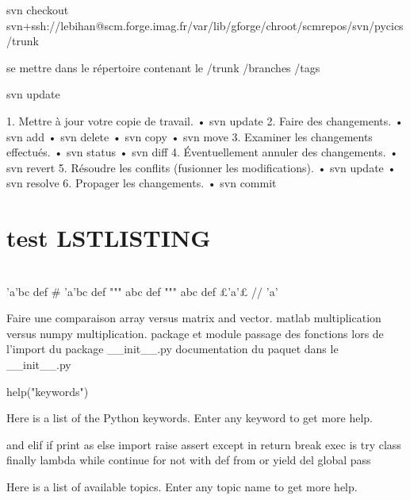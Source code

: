 svn checkout svn+ssh://lebihan@scm.forge.imag.fr/var/lib/gforge/chroot/scmrepos/svn/pycics/trunk

se mettre dans le répertoire contenant le /trunk /branches /tags 

svn update

1. Mettre à jour votre copie de travail.
• svn update
2. Faire des changements.
• svn add
• svn delete
• svn copy
• svn move
3. Examiner les changements effectués.
• svn status
• svn diff
4. Éventuellement annuler des changements.
• svn revert
5. Résoudre les conflits (fusionner les modifications).
• svn update
• svn resolve
6. Propager les changements.
• svn commit

\section{test LSTLISTING}
\begin{frame}[fragile]
\begin{pythonConsole}
\\ 'a'bc def
# 'a'bc def
""" abc def """
abc def
£'a'£
// 'a'
\end{pythonConsole}
\end{frame}
Faire une comparaison array versus matrix and vector. 
matlab multiplication versus numpy multiplication. 
package et module
passage des fonctions lors de l'import du package __init__.py
documentation du paquet dans le __init__.py

help("keywords")

Here is a list of the Python keywords.  Enter any keyword to get more help.

and                 elif                if                  print
as                  else                import              raise
assert              except              in                  return
break               exec                is                  try
class               finally             lambda              while
continue            for                 not                 with
def                 from                or                  yield
del                 global              pass                

Here is a list of available topics.  Enter any topic name to get more help.

